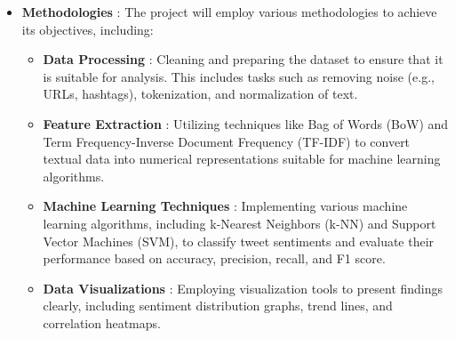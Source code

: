 \begin{itemize}
    \item \textbf{Methodologies} :
    \noindent
    The project will employ various methodologies to achieve its objectives, including:
    \begin{itemize}
        \item \textbf{Data Processing} :
        \noindent
        Cleaning and preparing the dataset to ensure that it is suitable for analysis. This includes tasks such as removing noise (e.g., URLs, hashtags), tokenization, and normalization of text.
        \item \textbf{Feature Extraction} :
        \noindent
        Utilizing techniques like Bag of Words (BoW) and Term Frequency-Inverse Document Frequency (TF-IDF) to convert textual data into numerical representations suitable for machine learning algorithms.
        \item \textbf{Machine Learning Techniques} :
        \noindent
        Implementing various machine learning algorithms, including k-Nearest Neighbors (k-NN) and Support Vector Machines (SVM), to classify tweet sentiments and evaluate their performance based on accuracy, precision, recall, and F1 score.
        \item \textbf{Data Visualizations} :
        \noindent
        Employing visualization tools to present findings clearly, including sentiment distribution graphs, trend lines, and correlation heatmaps.
    \end{itemize}
\end{itemize}

